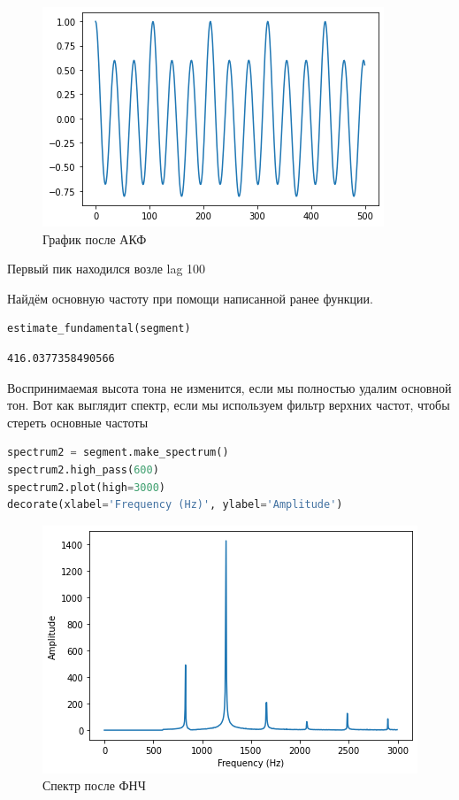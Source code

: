 \begin{figure}[H]
	\begin{center}
		\includegraphics[scale=1]{fig/lab05/lab05_9.png}
		\caption{График после АКФ}
	\end{center}
\end{figure}

Первый пик находился возле lag 100

Найдём основную частоту при помощи написанной ранее функции.

\begin{lstlisting}[language=Python]
estimate_fundamental(segment)
\end{lstlisting}

\begin{lstlisting}
416.0377358490566
\end{lstlisting}

Воспринимаемая высота тона не изменится, если мы полностью удалим основной тон. Вот как выглядит спектр, если мы используем фильтр верхних частот, чтобы стереть основные частоты

\begin{lstlisting}[language=Python]
spectrum2 = segment.make_spectrum()
spectrum2.high_pass(600)
spectrum2.plot(high=3000)
decorate(xlabel='Frequency (Hz)', ylabel='Amplitude')
\end{lstlisting}

\begin{figure}[H]
	\begin{center}
		\includegraphics[scale=1]{fig/lab05/lab05_10.png}
		\caption{Спектр после ФНЧ}
	\end{center}
\end{figure}

